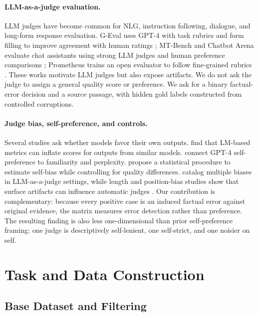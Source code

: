 \documentclass[11pt]{article}
\begin{document}
\paragraph{LLM-as-a-judge evaluation.}
LLM judges have become common for NLG, instruction following, dialogue, and long-form response evaluation. G-Eval uses GPT-4 with task rubrics and form filling to improve agreement with human ratings \citep{liu2023geval}; MT-Bench and Chatbot Arena evaluate chat assistants using strong LLM judges and human preference comparisons \citep{zheng2023judging}; Prometheus trains an open evaluator to follow fine-grained rubrics \citep{kim2023prometheus}. These works motivate LLM judges but also expose artifacts. We do not ask the judge to assign a general quality score or preference. We ask for a binary factual-error decision and a source passage, with hidden gold labels constructed from controlled corruptions.

\paragraph{Judge bias, self-preference, and controls.}
Several studies ask whether models favor their own outputs. \citet{liu2024narcissistic} find that LM-based metrics can inflate scores for outputs from similar models. \citet{wataoka2024selfpreference} connect GPT-4 self-preference to familiarity and perplexity. \citet{spiliopoulou2025playfavorites} propose a statistical procedure to estimate self-bias while controlling for quality differences. \citet{ye2024justice} catalog multiple biases in LLM-as-a-judge settings, while length and position-bias studies show that surface artifacts can influence automatic judges \citep{dubois2024length,shi2024position}. Our contribution is complementary: because every positive case is an induced factual error against original evidence, the matrix measures error detection rather than preference. The resulting finding is also less one-dimensional than prior self-preference framing: one judge is descriptively self-lenient, one self-strict, and one noisier on self.

\section{Task and Data Construction}

\subsection{Base Dataset and Filtering}
\end{document}
